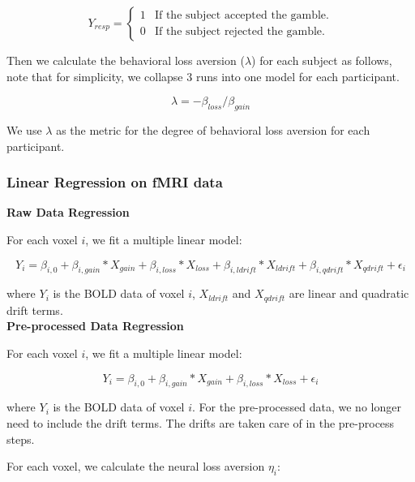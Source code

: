 \documentclass[11pt]{article}
\begin{document}
\begin{displaymath}
Y_{resp} = \left \{ \begin{array}{ll}
1 & \textrm{If the subject accepted the gamble.} \\
0 & \textrm{If the subject rejected the gamble.}
\end{array} \right .
\end{displaymath}

Then we calculate the behavioral loss aversion ($ \lambda $) for each subject as follows, note that for simplicity, we collapse 3 runs into one model for each participant.

\begin{equation}
\lambda = -\beta_{loss} / \beta_{gain}
\end{equation}

We use $\lambda$ as the metric for the degree of behavioral loss aversion for each participant. 

\subsubsection{Linear Regression on fMRI data}

\textbf{Raw Data Regression}

For each voxel $i$, we fit a multiple linear model:

\begin{equation}
Y_{i} = \beta_{i, 0} + \beta_{i, gain} * X_{gain}  + \beta_{i, loss} *X_{loss} 
+ \beta_{i,ldrift} *X_{ldrift} + \beta_{i, qdrift} * X_{qdrift} 
+ \epsilon_i
\end{equation}

where $Y_{i}$ is the BOLD data of voxel $i$,  $X_{ldrift}$ and $X_{qdrift}$ are linear and quadratic drift terms. \\

\textbf{Pre-processed Data Regression}

For each voxel $i$, we fit a multiple linear model:

\begin{equation}
Y_{i} = \beta_{i, 0} + \beta_{i, gain} * X_{gain}  +  \beta_{i, loss} *X_{loss} + \epsilon_i
\end{equation}

where $Y_{i}$ is the BOLD data of voxel $i$.
For the pre-processed data, we no longer need to include the drift terms. The drifts are taken care of in the pre-process steps.

For each voxel, we calculate the 
neural loss aversion $\eta_i$:
\end{document}

